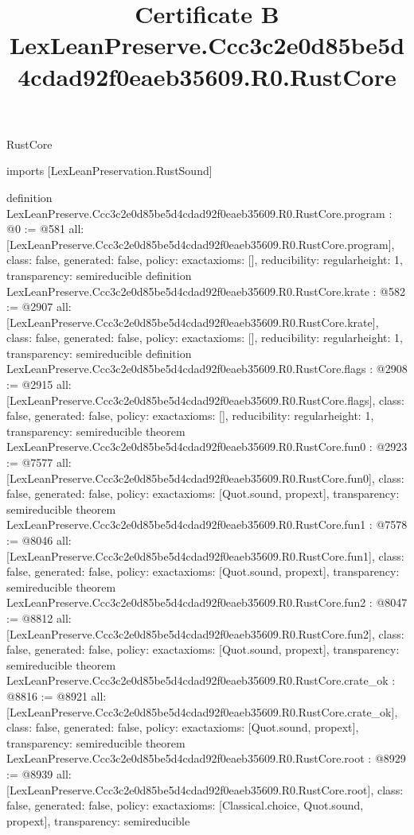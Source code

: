 \begin{lexlean}{RustCore}
\title{Certificate B LexLeanPreserve.Ccc3c2e0d85be5d4cdad92f0eaeb35609.R0.RustCore}
\begin{coremodule}
imports [LexLeanPreservation.RustSound]

definition LexLeanPreserve.Ccc3c2e0d85be5d4cdad92f0eaeb35609.R0.RustCore.program : @0 := @581 {
  all: [LexLeanPreserve.Ccc3c2e0d85be5d4cdad92f0eaeb35609.R0.RustCore.program],
  class: false,
  generated: false,
  policy: exact{axioms: []},
  reducibility: regular{height: 1},
  transparency: semireducible
}
definition LexLeanPreserve.Ccc3c2e0d85be5d4cdad92f0eaeb35609.R0.RustCore.krate : @582 := @2907 {
  all: [LexLeanPreserve.Ccc3c2e0d85be5d4cdad92f0eaeb35609.R0.RustCore.krate],
  class: false,
  generated: false,
  policy: exact{axioms: []},
  reducibility: regular{height: 1},
  transparency: semireducible
}
definition LexLeanPreserve.Ccc3c2e0d85be5d4cdad92f0eaeb35609.R0.RustCore.flags : @2908 := @2915 {
  all: [LexLeanPreserve.Ccc3c2e0d85be5d4cdad92f0eaeb35609.R0.RustCore.flags],
  class: false,
  generated: false,
  policy: exact{axioms: []},
  reducibility: regular{height: 1},
  transparency: semireducible
}
theorem LexLeanPreserve.Ccc3c2e0d85be5d4cdad92f0eaeb35609.R0.RustCore.fun0 : @2923 := @7577 {
  all: [LexLeanPreserve.Ccc3c2e0d85be5d4cdad92f0eaeb35609.R0.RustCore.fun0],
  class: false,
  generated: false,
  policy: exact{axioms: [Quot.sound, propext]},
  transparency: semireducible
}
theorem LexLeanPreserve.Ccc3c2e0d85be5d4cdad92f0eaeb35609.R0.RustCore.fun1 : @7578 := @8046 {
  all: [LexLeanPreserve.Ccc3c2e0d85be5d4cdad92f0eaeb35609.R0.RustCore.fun1],
  class: false,
  generated: false,
  policy: exact{axioms: [Quot.sound, propext]},
  transparency: semireducible
}
theorem LexLeanPreserve.Ccc3c2e0d85be5d4cdad92f0eaeb35609.R0.RustCore.fun2 : @8047 := @8812 {
  all: [LexLeanPreserve.Ccc3c2e0d85be5d4cdad92f0eaeb35609.R0.RustCore.fun2],
  class: false,
  generated: false,
  policy: exact{axioms: [Quot.sound, propext]},
  transparency: semireducible
}
theorem LexLeanPreserve.Ccc3c2e0d85be5d4cdad92f0eaeb35609.R0.RustCore.crate_ok : @8816 := @8921 {
  all: [LexLeanPreserve.Ccc3c2e0d85be5d4cdad92f0eaeb35609.R0.RustCore.crate_ok],
  class: false,
  generated: false,
  policy: exact{axioms: [Quot.sound, propext]},
  transparency: semireducible
}
theorem LexLeanPreserve.Ccc3c2e0d85be5d4cdad92f0eaeb35609.R0.RustCore.root : @8929 := @8939 {
  all: [LexLeanPreserve.Ccc3c2e0d85be5d4cdad92f0eaeb35609.R0.RustCore.root],
  class: false,
  generated: false,
  policy: exact{axioms: [Classical.choice, Quot.sound, propext]},
  transparency: semireducible
}


\end{coremodule}
\end{lexlean}
